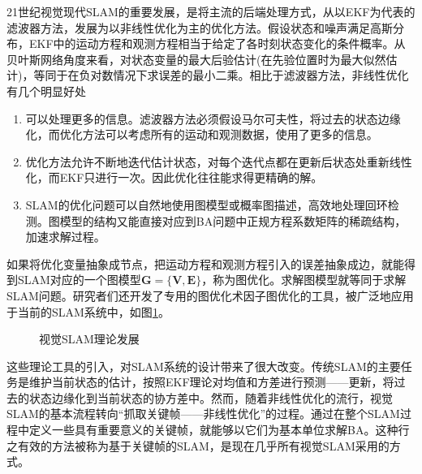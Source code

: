 21世纪视觉现代SLAM的重要发展，是将主流的后端处理方式，从以EKF为代表的滤波器方法，发展为以非线性优化为主的优化方法。假设状态和噪声满足高斯分布，EKF中的运动方程和观测方程相当于给定了各时刻状态变化的条件概率。从贝叶斯网络角度来看，对状态变量的最大后验估计(在先验位置时为最大似然估计)，等同于在负对数情况下求误差的最小二乘\upcite{}。相比于滤波器方法，非线性优化有几个明显好处
\begin{enumerate}[label={(\arabic*)}]
\item 可以处理更多的信息。滤波器方法必须假设马尔可夫性，将过去的状态边缘化，而优化方法可以考虑所有的运动和观测数据，使用了更多的信息。
\item 优化方法允许不断地迭代估计状态，对每个迭代点都在更新后状态处重新线性化，而EKF只进行一次。因此优化往往能求得更精确的解。
\item SLAM的优化问题可以自然地使用图模型或概率图描述，高效地处理回环检测。图模型的结构又能直接对应到BA问题中正规方程系数矩阵的稀疏结构，加速求解过程。
\end{enumerate}
如果将优化变量抽象成节点，把运动方程和观测方程引入的误差抽象成边，就能得到SLAM对应的一个图模型$\boldsymbol{G}=\lbrace \boldsymbol{V}, \boldsymbol{E} \rbrace$，称为图优化\upcite{}。求解图模型就等同于求解SLAM问题。研究者们还开发了专用的图优化术因子图优化的工具\upcite{}，被广泛地应用于当前的SLAM系统中，如图\ref{fig1.1}。

\begin{figure}[h]
\centering
\caption{视觉SLAM理论发展}
\label{fig1.1}
\end{figure}

这些理论工具的引入，对SLAM系统的设计带来了很大改变。传统SLAM的主要任务是维护当前状态的估计，按照EKF理论对均值和方差进行预测——更新，将过去的状态边缘化到当前状态的协方差中。然而，随着非线性优化的流行，视觉SLAM的基本流程转向“抓取关键帧——非线性优化”的过程。通过在整个SLAM过程中定义一些具有重要意义的关键帧，就能够以它们为基本单位求解BA。这种行之有效的方法被称为基于关键帧的SLAM，是现在几乎所有视觉SLAM采用的方式\upcite{}。

